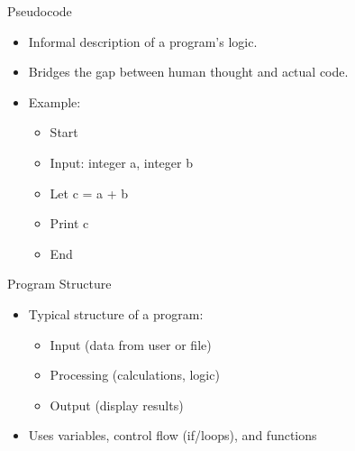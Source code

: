 \documentclass[12pt, aspectratio=169]{beamer}
\begin{document}
    \begin{frame}{Pseudocode}
        \begin{itemize}
            \item Informal description of a program’s logic.
            \item Bridges the gap between human thought and actual code.
            \item Example:
            \begin{itemize}
                \item Start
                \item Input: integer a, integer b
                \item Let c = a + b
                \item Print c
                \item End
            \end{itemize}
        \end{itemize}
    \end{frame}


    \begin{frame}{Program Structure}
        \begin{itemize}
            \item Typical structure of a program:
            \begin{itemize}
                \item Input (data from user or file)
                \item Processing (calculations, logic)
                \item Output (display results)
            \end{itemize}
            \item Uses variables, control flow (if/loops), and functions
        \end{itemize}
    \end{frame}
\end{document}
